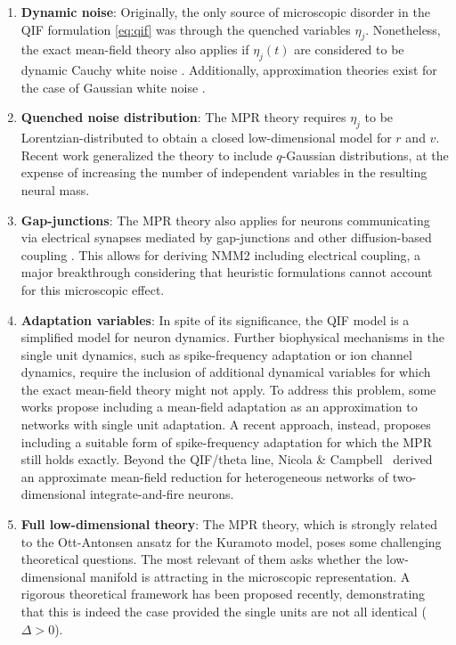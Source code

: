 \documentclass[11pt]{article}
\numberwithin{equation}{section}
\newcommand{\rev}[1]{\begingroup\color{black}#1\endgroup}
\begin{document}
\begin{enumerate}
    \item \textbf{Dynamic noise}: Originally, the only source of microscopic disorder in the QIF formulation \eqref{eq:qif} was through the quenched variables $\eta_j$.
    Nonetheless, the exact mean-field theory also applies if $\eta_j(t)$ are considered to be
    dynamic Cauchy white noise \cite{clusella2024}. Additionally, approximation theories exist for the case of Gaussian white noise \cite{Goldobin2021,Goldobin2021_2}.
    \item \textbf{Quenched noise distribution}: The MPR theory requires $\eta_j$ to be Lorentzian-distributed to obtain a closed low-dimensional model for $r$ and $v$.
    Recent work generalized the theory to include $q$-Gaussian distributions, at the expense of
    increasing the number of independent variables in the resulting neural mass\cite{PP22,PP24}. 
    \item \textbf{Gap-junctions}: The MPR theory also applies for neurons communicating via electrical synapses mediated by gap-junctions and other diffusion-based coupling \cite{Pietras2019,Montbrio:2020aa}. This allows for deriving NMM2 including electrical coupling, a major breakthrough considering that heuristic formulations cannot account for this microscopic effect. 
    \item \textbf{Adaptation variables}: In spite of its significance, the QIF model is a simplified model for neuron dynamics. Further biophysical mechanisms in the single unit dynamics, such as spike-frequency adaptation or ion channel dynamics, require the inclusion of additional dynamical variables for which the exact mean-field theory might not apply.
    To address this problem, some works propose including a mean-field adaptation as an approximation to networks with single unit adaptation\cite{chenExactMeanfieldModels2022,ferraraPopulationSpikingBursting2023}. 
    A recent approach, instead, proposes including a suitable form of spike-frequency adaptation for which the MPR still holds exactly\cite{Pietras2025}. \rev{Beyond the QIF/theta line, Nicola \& Campbell~\cite{NicolaCampbell2013} derived an approximate mean-field reduction for heterogeneous networks of two-dimensional integrate-and-fire neurons.}
    \item \textbf{Full low-dimensional theory}: The MPR theory, which is strongly related to the Ott-Antonsen ansatz for the Kuramoto model\cite{Ott2008}, poses some challenging theoretical questions. The most relevant of them asks whether the low-dimensional manifold is attracting in the microscopic representation. A rigorous theoretical framework has been proposed recently, demonstrating that this is indeed the case provided the single units are not all identical ($\Delta>0$)\cite{Pietras2023}. 

\end{enumerate}
\end{document}
